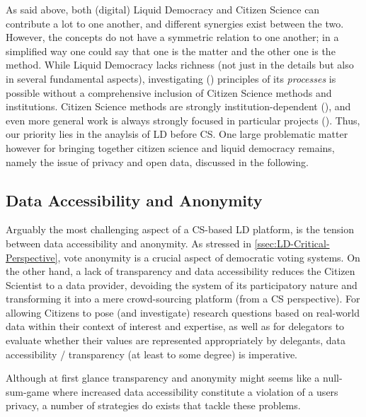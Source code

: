 As said above, both (digital) Liquid Democracy and Citizen Science can contribute a lot to one another, and different synergies exist between the two. However, the concepts do not have a symmetric relation to one another; in a simplified way one could say that one is the matter and the other one is the method. While Liquid Democracy lacks richness (not just in the details but also in several fundamental aspects), investigating () principles of its \textit{processes} is possible without a comprehensive inclusion of Citizen Science methods and institutions. Citizen Science methods are strongly institution-dependent (), and even more general work is always strongly focused in particular projects (). Thus, our priority lies in the anaylsis of LD before CS.
One large problematic matter however for bringing together citizen science and liquid democracy remains, namely the issue of privacy and open data, discussed in the following.


\subsection{Data Accessibility and Anonymity}
\label{ssec:Integration_AccessibilityAnonymity}
Arguably the most challenging aspect of a CS-based LD platform, is the tension between data accessibility and anonymity. As stressed  in \ref{ssec:LD-Critical-Perspective}, vote anonymity is a crucial aspect of democratic voting systems. On the other hand, a lack of transparency and data accessibility reduces the Citizen Scientist to a data provider, devoiding the system of its participatory nature and transforming it into a mere crowd-sourcing platform (from a CS perspective). For allowing Citizens to pose (and investigate) research questions based on real-world data within their context of interest and expertise, as well as for delegators to evaluate whether their values are represented appropriately by delegants, data accessibility / transparency (at least to some degree) is imperative.

Although at first glance transparency and anonymity might seems like a null-sum-game where increased data accessibility constitute a violation of a users privacy, a number of strategies do exists that tackle these problems. 

